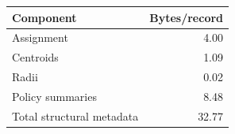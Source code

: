 \begin{tabular}{lr}
\toprule
Component & Bytes/record\\
\midrule
Assignment & 4.00\\
Centroids & 1.09\\
Radii & 0.02\\
Policy summaries & 8.48\\
Total structural metadata & 32.77\\
\bottomrule
\end{tabular}
